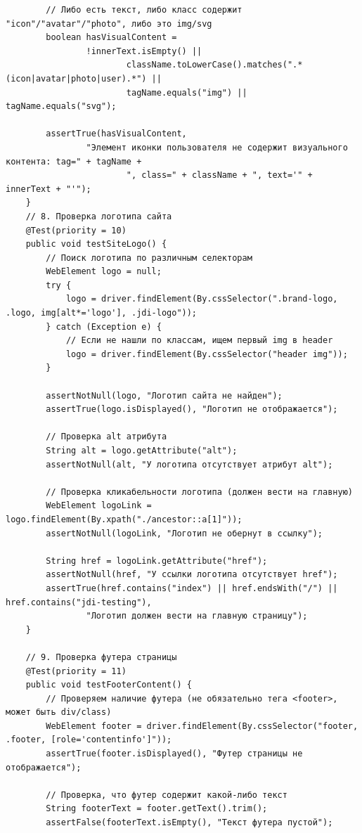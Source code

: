 \documentclass{article}[14pt]
\begin{document}
\begin{lstlisting}
        // Либо есть текст, либо класс содержит "icon"/"avatar"/"photo", либо это img/svg
        boolean hasVisualContent =
                !innerText.isEmpty() ||
                        className.toLowerCase().matches(".*(icon|avatar|photo|user).*") ||
                        tagName.equals("img") || tagName.equals("svg");

        assertTrue(hasVisualContent,
                "Элемент иконки пользователя не содержит визуального контента: tag=" + tagName +
                        ", class=" + className + ", text='" + innerText + "'");
    }
    // 8. Проверка логотипа сайта
    @Test(priority = 10)
    public void testSiteLogo() {
        // Поиск логотипа по различным селекторам
        WebElement logo = null;
        try {
            logo = driver.findElement(By.cssSelector(".brand-logo, .logo, img[alt*='logo'], .jdi-logo"));
        } catch (Exception e) {
            // Если не нашли по классам, ищем первый img в header
            logo = driver.findElement(By.cssSelector("header img"));
        }

        assertNotNull(logo, "Логотип сайта не найден");
        assertTrue(logo.isDisplayed(), "Логотип не отображается");

        // Проверка alt атрибута
        String alt = logo.getAttribute("alt");
        assertNotNull(alt, "У логотипа отсутствует атрибут alt");

        // Проверка кликабельности логотипа (должен вести на главную)
        WebElement logoLink = logo.findElement(By.xpath("./ancestor::a[1]"));
        assertNotNull(logoLink, "Логотип не обернут в ссылку");

        String href = logoLink.getAttribute("href");
        assertNotNull(href, "У ссылки логотипа отсутствует href");
        assertTrue(href.contains("index") || href.endsWith("/") || href.contains("jdi-testing"),
                "Логотип должен вести на главную страницу");
    }

    // 9. Проверка футера страницы
    @Test(priority = 11)
    public void testFooterContent() {
        // Проверяем наличие футера (не обязательно тега <footer>, может быть div/class)
        WebElement footer = driver.findElement(By.cssSelector("footer, .footer, [role='contentinfo']"));
        assertTrue(footer.isDisplayed(), "Футер страницы не отображается");

        // Проверка, что футер содержит какой-либо текст
        String footerText = footer.getText().trim();
        assertFalse(footerText.isEmpty(), "Текст футера пустой");


\end{lstlisting}
\end{document}
